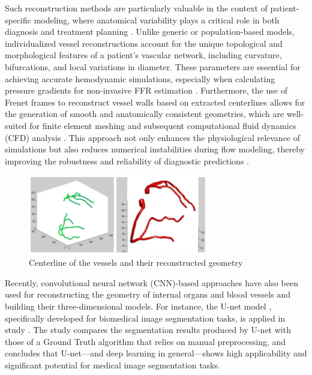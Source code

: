 \documentclass[default]{subfiles}
\begin{document}
Such reconstruction methods are particularly valuable in the context of patient-specific modeling, where anatomical
variability plays a critical role in both diagnosis and treatment planning \cite{chakshu_2022}. Unlike generic or
population-based models, individualized vessel reconstructions account for the unique topological and morphological
features of a patient's vascular network, including curvature, bifurcations, and local variations in diameter. These
parameters are essential for achieving accurate hemodynamic simulations, especially when calculating pressure gradients
for non-invasive FFR estimation \cite{yu_2022}. Furthermore, the use of Frenet frames to reconstruct vessel walls based
on extracted centerlines allows for the generation of smooth and anatomically consistent geometries, which are
well-suited for finite element meshing and subsequent computational fluid dynamics (CFD) analysis
\cite{csippa_2021_decomposition}. This approach not only enhances the physiological relevance of simulations but also
reduces numerical instabilities during flow modeling, thereby improving the robustness and reliability of diagnostic
predictions \cite{decroocq_2023}.


\begin{figure}[H]
  \centering
  \includegraphics[width=0.7\textwidth]{image/pic2.png}
  \caption{Centerline of the vessels and their reconstructed geometry \cite{lu2020vessels}}
\end{figure}

Recently, convolutional neural network (CNN)-based approaches have also been used for reconstructing the geometry of
internal organs and blood vessels and building their three-dimensional models. For instance, the U-net model
\cite{ronneberger2015unet}, specifically developed for biomedical image segmentation tasks, is applied in study
\cite{ramakrishnan2023vessels}. The study compares the segmentation results produced by U-net with those of a Ground
Truth algorithm that relies on manual preprocessing, and concludes that U-net—and deep learning in general—shows high
applicability and significant potential for medical image segmentation tasks.
\end{document}
